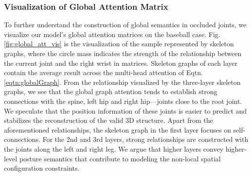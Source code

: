 \documentclass[letterpaper, 10 pt, conference, twoside]{ieeeconf}
\begin{document}
\subsubsection{Visualization of Global Attention Matrix }
To further understand the construction of global semantics in occluded joints, we visualize our model's global attention matrices  on the baseball case. Fig. \ref{fig:global_att_vis} is the visualization of the sample represented by skeleton graphs, where the circle mass indicates the strength of the relationship between the current joint and the right wrist in matrices. Skeleton graphs of each layer contain the average result across the multi-head attention of Eqtn. \ref{eqtn:globalGraph}. From the relationship visualized by the three-layer skeleton graphs, we see that the global graph attention tends to establish strong connections with the spine, left hip and right hip---joints close to the root joint. We speculate that the position information of these joints is easier to predict and stabilizes the reconstruction of the valid 3D structure. Apart from the aforementioned relationships, the skeleton graph in the first layer focuses on self-connections. For the 2nd and 3rd layers, strong relationships are constructed with the joints along the left and right leg. We argue that higher layers convey higher-level posture semantics that contribute to modeling the non-local spatial configuration constraints.
\end{document}
